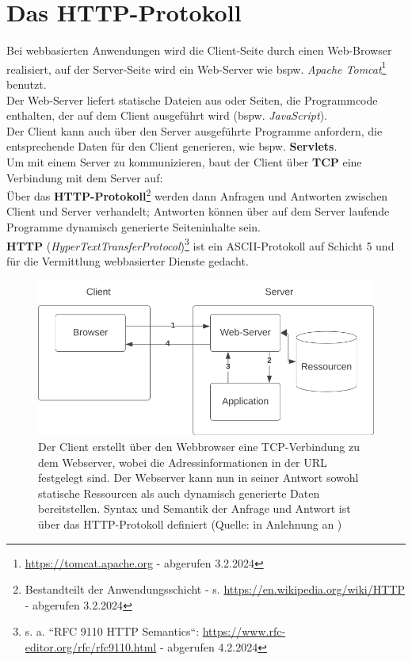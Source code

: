 \section{Das HTTP-Protokoll}

Bei webbasierten Anwendungen wird die Client-Seite durch einen Web-Browser realisiert, auf der Server-Seite wird ein Web-Server wie bspw. \textit{Apache Tomcat}\footnote{
    \url{https://tomcat.apache.org} - abgerufen 3.2.2024
} benutzt.\\

\noindent
Der Web-Server liefert statische Dateien aus oder Seiten, die Programmcode enthalten, der auf dem Client ausgeführt wird (bspw. \textit{JavaScript}).\\

\noindent
Der Client kann auch über den Server ausgeführte Programme anfordern, die entsprechende Daten für den Client generieren, wie bspw. \textbf{Servlets}.\\

\noindent
Um mit einem Server zu kommunizieren, baut der Client über \textbf{TCP} eine Verbindung mit dem Server auf:\\
Über das \textbf{HTTP-Protokoll}\footnote{
Bestandteilt der Anwendungsschicht - s. \url{https://en.wikipedia.org/wiki/HTTP} - abgerufen 3.2.2024
} werden dann Anfragen und Antworten zwischen Client und Server verhandelt; Antworten können über auf dem Server laufende Programme dynamisch generierte Seiteninhalte sein.\\

\noindent
\textbf{HTTP} (\textit{HyperTextTransferProtocol})\footnote{
    s. a. ``RFC 9110 HTTP Semantics``: \url{https://www.rfc-editor.org/rfc/rfc9110.html} - abgerufen 4.2.2024
} ist ein ASCII-Protokoll auf Schicht 5 und für die Vermittlung webbasierter Dienste gedacht.

\begin{figure}
    \centering
    \includegraphics[scale=0.5]{chapters/fopt6/img/clientserver}
    \caption{Der Client erstellt über den Webbrowser eine TCP-Verbindung zu dem Webserver, wobei die Adressinformationen in der URL festgelegt sind.
    Der Webserver kann nun in seiner Antwort sowohl statische Ressourcen als auch dynamisch generierte Daten bereitstellen.
    Syntax und Semantik der Anfrage und Antwort ist über das HTTP-Protokoll definiert (Quelle: in Anlehnung an \cite[402, Bild 8.1]{Oec22})}
    \label{fig:clientserver}
\end{figure}


